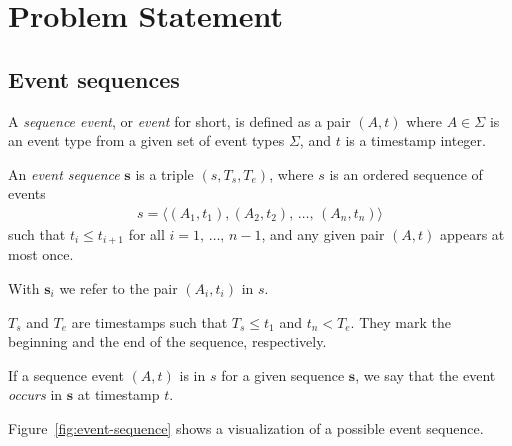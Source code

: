 \section{Problem Statement}

\subsection{Event sequences}

\begin{definition}
A \emph{sequence event}, or \emph{event} for short, is defined as a pair $ (A, t) $ where $ A \in \Sigma $ is an event type from a given set of event types $ \Sigma $, and $ t $ is a timestamp integer.
\end{definition}

\begin{definition}
An \emph{event sequence} $ \boldsymbol{s} $ is a triple $ (s, T_s, T_e) $, where $ s $ is an ordered sequence of events
\begin{align*}
s = \langle (A_1, t_1), (A_2, t_2), \, \ldots, \, (A_n, t_n) \rangle
\end{align*}
such that $ t_i \leq t_{i + 1} $ for all $ i = 1, \, \ldots, \, n - 1 $, and any given pair $ (A, t) $ appears at most once.

With $ \boldsymbol{s}_i $ we refer to the pair $ (A_i, t_i) $ in $ s $.

$ T_s $ and $ T_e $ are timestamps such that $ T_s \leq t_1 $ and $ t_n < T_e $. They mark the beginning and the end of the sequence, respectively.

If a sequence event $ (A, t) $ is in $ s $ for a given sequence $ \boldsymbol{s} $, we say that the event \emph{occurs} in $ \boldsymbol{s} $ at timestamp $ t $.
\end{definition}

Figure~\ref{fig:event-sequence} shows a visualization of a possible event sequence.

\newcommand{\examplesequence}
{
    \draw (-5.5,0) -- (5.5,0);

    \foreach \x in {-5.5,-5,...,5.5}
        \draw (\x,0) -- (\x,3pt);

    \foreach \x [evaluate=\x as \timestamp using int((\x*2)+41)] in {-5.5,-3,...,5.5}
        \node at (\x,-1em) {$ \timestamp $};

    \foreach \x/\eventtype in {
      -4.5/c,
      -4/f,
      -3.5/b,
      -3/b,
      -1.5/c,
      -0.5/d,
      -0/a,
      1.5/b,
      2.5/e,
      3/a,
      3.5/e,
      4/c}
        \node [font=\vphantom{$ fbd $}] at (\x,1em) {$ \eventtype $};
}

